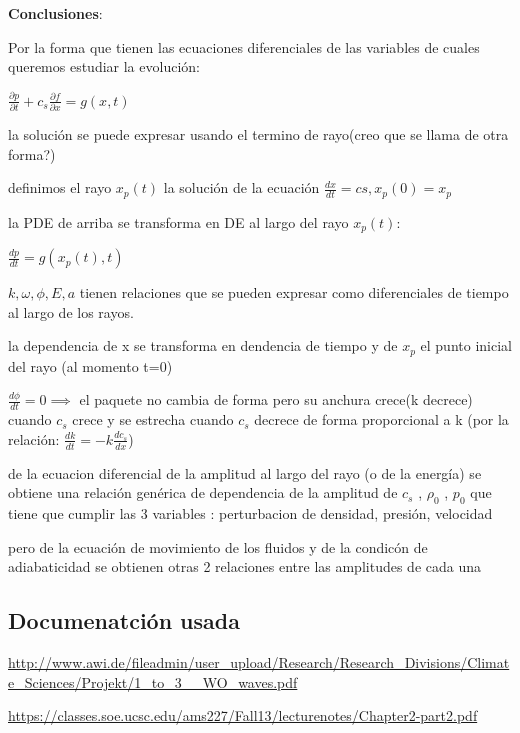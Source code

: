 \documentclass{article}
\begin{document}
\textbf{Conclusiones}:
\begin{description}
\item Por la forma que tienen las ecuaciones diferenciales de las variables de cuales queremos estudiar la evolución:
\item $\frac{\partial p}{\partial t} + c_s \frac{\partial f}{\partial x} = g(x,t)$
\item la solución se puede expresar usando el termino de rayo(creo que se llama de otra forma?)
\item definimos el rayo $x_p(t)$ la solución de la ecuación $\frac{dx}{dt} = cs, x_p(0) = x_p$
\item la PDE de arriba se transforma en DE al largo del rayo $x_p(t)$:
\item $\frac{dp}{dt} = g(x_p(t), t)$
\item $k,\omega, \phi, E, a$ tienen relaciones que se pueden expresar como diferenciales de tiempo al largo de los rayos. 
\item la dependencia de x se transforma en dendencia de tiempo y de $x_p$ el punto inicial del rayo (al momento t=0)
\item $\frac{d\phi}{dt} = 0 \implies $ el paquete no cambia de forma pero su anchura crece(k decrece) cuando $ c_s$ crece y se estrecha cuando $c_s$ 
decrece de forma proporcional a k (por la relación: $\frac{dk}{dt} = -k \frac{dc_s}{dx}$)
\item de la ecuacion diferencial de  la amplitud al largo del rayo (o de la energía) se obtiene una relación genérica de dependencia de la amplitud  de $c_s$ , $\rho_0$ , $p_0$ que tiene  que cumplir las 3 variables : perturbacion de densidad, presión, velocidad
\item pero de la ecuación de movimiento de los fluidos y de la condicón de adiabaticidad se obtienen otras 2 relaciones entre las amplitudes de cada una
\end{description}

\newpage 


\newpage 
\subsection{Documenatción usada}
\begin{description}
\item \href{http://www.awi.de/fileadmin/user\_upload/Research/Research\_Divisions/Climate\_Sciences/Projekt/1\_to\_3\_\_WO\_waves.pdf}{http://www.awi.de/fileadmin/user\_upload/Research/Research\_Divisions/Climate\_Sciences/Projekt/1\_to\_3\_\_WO\_waves.pdf}
\item \href{https://classes.soe.ucsc.edu/ams227/Fall13/lecturenotes/Chapter2-part2.pdf}{https://classes.soe.ucsc.edu/ams227/Fall13/lecturenotes/Chapter2-part2.pdf}
\end{description}
\end{document}
